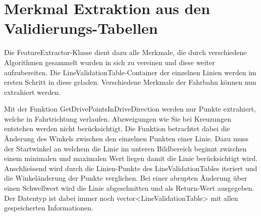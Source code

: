 %

\chapter{Merkmal Extraktion aus den Validierungs-Tabellen}
\label{cha:Merkmal Extraktion aus den Validierungs-Tabellen} 
%
%
Die FeatureExtractor-Klasse dient dazu alle Merkmale, die durch verschiedene Algorithmen gesammelt wurden in sich zu vereinen und diese weiter aufzubereiten. Die LineValidationTable-Container der einzelnen Linien werden im ersten Schritt in diese geladen. Verschiedene Merkmale der Fahrbahn k{\"o}nnen nun extrahiert werden.

Mit der Funktion GetDrivePointsInDriveDirection werden nur Punkte extrahiert, welche in Fahrtrichtung verlaufen. Abzweigungen wie Sie bei Kreuzungen entstehen werden nicht ber{\"u}cksichtigt.
Die Funktion betrachtet dabei die {\"A}nderung des Winkels zwischen den einzelnen Punkten einer Linie. Dazu muss der Startwinkel an welchem die Linie im unteren Bildbereich beginnt zwischen einem minimalen und maximalen Wert liegen damit die Linie ber{\"u}cksichtigt wird. Anschlie{\"ss}end wird durch die Linien-Punkte des LineValidationTables iteriert und die Winkel{\"a}nderung der Punkte verglichen. Bei einer abrupten {\"A}nderung {\"u}ber einen Schwellwert wird die Linie abgeschnitten und als Return-Wert ausgegeben. Der Datentyp ist dabei immer noch vector<LineValidationTable> mit allen gespeicherten Informationen.












